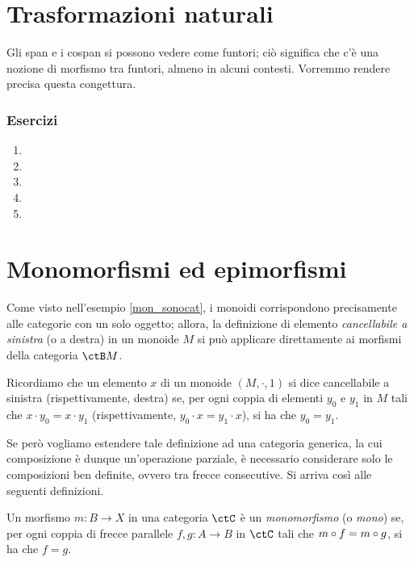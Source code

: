 \section{Trasformazioni naturali}\label{sec_tnat}
Gli span e i cospan si possono vedere come funtori; ciò significa che c'è una nozione di morfismo tra funtori, almeno in alcuni contesti. Vorremmo rendere precisa questa congettura.
\subsubsection*{Esercizi}
\begin{enumerate}
	\item
	\item
	\item
	\item
	\item
\end{enumerate}
\section{Monomorfismi ed epimorfismi}\label{sec_monoepi}

Come visto nell'esempio \ref{mon_sonocat}, i monoidi corrispondono precisamente alle categorie con un solo oggetto; allora,
la definizione di elemento \emph{cancellabile a sinistra} (o a destra) in un monoide \(M\) si può applicare direttamente ai morfismi della categoria \(\ctB M\).

Ricordiamo che un elemento \(x\) di un monoide \((M, \cdot, 1)\) si dice cancellabile a sinistra (rispettivamente, destra) se,
per ogni coppia di elementi \(y_0\) e \(y_1\) in \(M\) tali che \(x \cdot y_0 = x \cdot y_1\) (rispettivamente, \(y_0 \cdot x = y_1 \cdot x\)), si ha che \(y_0 = y_1\).

Se però vogliamo estendere tale definizione ad una categoria generica,
la cui composizione è dunque un'operazione parziale,
è necessario considerare solo le composizioni ben definite, ovvero tra frecce consecutive.
Si arriva così alle seguenti definizioni.

\begin{definition}[Monomorfismo]\label{def_Mono}
	Un morfismo \(m \colon B \to X\) in una categoria \(\ctC\) è un \emph{monomorfismo} (o \emph{mono}) se,
	per ogni coppia di frecce parallele \(f, g \colon A \to B\) in \(\ctC\) tali che \(m \circ f = m \circ g\), si ha che \(f = g\).
\end{definition}

